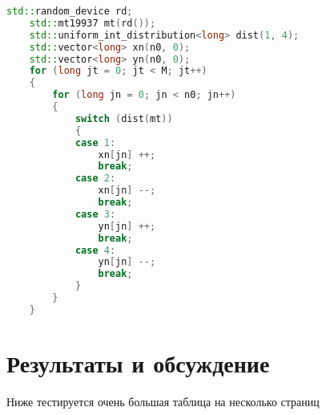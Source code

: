 \documentclass[a4paper,14pt]{extarticle}
\begin{document}
    \begin{lstlisting}[language=C++,caption={Подпрограмма случайного блуждания на плоскости},label={listing-2}]
    std::random_device rd;
    std::mt19937 mt(rd());
    std::uniform_int_distribution<long> dist(1, 4);
    std::vector<long> xn(n0, 0);
    std::vector<long> yn(n0, 0);
    for (long jt = 0; jt < M; jt++)
    {
        for (long jn = 0; jn < n0; jn++)
        {
            switch (dist(mt))
            {
            case 1:
                xn[jn] ++;
                break;
            case 2:
                xn[jn] --;
                break;
            case 3:
                yn[jn] ++;
                break;
            case 4:
                yn[jn] --;
                break;
            }
        }
    }
    \end{lstlisting}

\pagebreak
\section{Результаты и обсуждение}

Ниже тестируется очень большая таблица на несколько страниц
\end{document}
